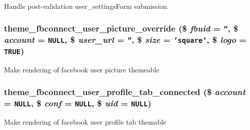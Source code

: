 Handle post-validation user\_\-settingsForm submission. \hypertarget{fbconnect_8pages_8inc_ff0cf6618c1630539af7e20931f21a89}{
\subsubsection[{theme\_\-fbconnect\_\-user\_\-picture\_\-override}]{\setlength{\rightskip}{0pt plus 5cm}theme\_\-fbconnect\_\-user\_\-picture\_\-override (\$ {\em fbuid} = {\tt ''}, \/  \$ {\em account} = {\tt NULL}, \/  \$ {\em user\_\-url} = {\tt ''}, \/  \$ {\em size} = {\tt 'square'}, \/  \$ {\em logo} = {\tt TRUE})}}
\label{fbconnect_8pages_8inc_ff0cf6618c1630539af7e20931f21a89}


Make rendering of facebook user picture themeable \hypertarget{fbconnect_8pages_8inc_f52fd707c975eb869c369774b5014bee}{
\subsubsection[{theme\_\-fbconnect\_\-user\_\-profile\_\-tab\_\-connected}]{\setlength{\rightskip}{0pt plus 5cm}theme\_\-fbconnect\_\-user\_\-profile\_\-tab\_\-connected (\$ {\em account} = {\tt NULL}, \/  \$ {\em conf} = {\tt NULL}, \/  \$ {\em uid} = {\tt NULL})}}
\label{fbconnect_8pages_8inc_f52fd707c975eb869c369774b5014bee}


Make rendering of facebook user profile tab themable 